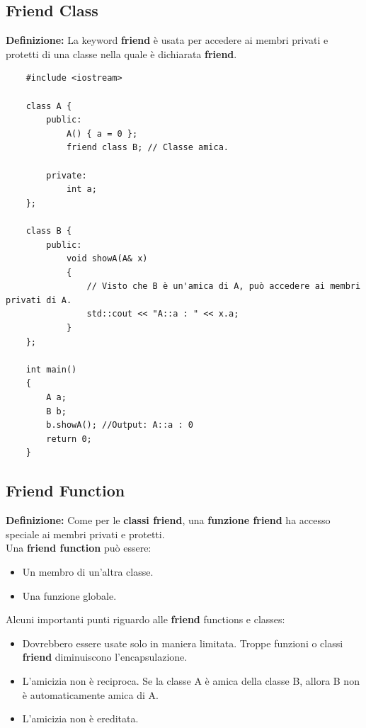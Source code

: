 \subsection{Friend Class}

\textsf{\small \textbf{Definizione: } La keyword \textbf{friend} è usata per accedere ai membri privati e protetti di una classe nella quale è dichiarata \textbf{friend}.} \\

\begin{lstlisting}
	#include <iostream>
	
	class A {
		public:
			A() { a = 0 };
			friend class B; // Classe amica.
			
		private:
			int a;
	};

	class B {
		public:
			void showA(A& x)
			{
				// Visto che B è un'amica di A, può accedere ai membri privati di A.
				std::cout << "A::a : " << x.a; 
			}
	};

	int main()
	{
		A a;
		B b;
		b.showA(); //Output: A::a : 0
		return 0;
	}
\end{lstlisting}

\subsection{Friend Function}

\textsf{\small \textbf{Definizione: } Come per le \textbf{classi friend}, una \textbf{funzione friend} ha accesso speciale ai membri privati e protetti.} \\

\textsf{\small Una \textbf{friend function} può essere: } \\

\begin{itemize}
	\item \textsf{\small Un membro di un'altra classe.}
	\item \textsf{\small Una funzione globale.}
\end{itemize}

\textsf{\small Alcuni importanti punti riguardo alle \textbf{friend} functions e classes: } \\

\begin{itemize}
	\item \textsf{\small Dovrebbero essere usate solo in maniera limitata. Troppe funzioni o classi \textbf{friend} diminuiscono l'encapsulazione.}
	\item \textsf{\small L'amicizia non è reciproca. Se la classe A è amica della classe B, allora B non è automaticamente amica di A.}
	\item \textsf{\small L'amicizia non è ereditata.}
\end{itemize}

